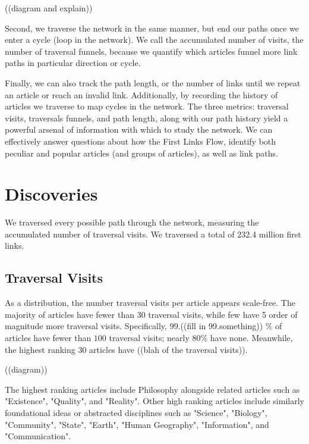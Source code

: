 \documentclass[twoside]{article}
\begin{document}
((diagram and explain))

Second, we traverse the network in the same manner, but end our paths once we enter a cycle (loop in the network).
We call the accumulated number of visits, the number of traversal funnels, because we quantify
which articles funnel more link paths in particular direction or cycle.

Finally, we can also track the path length, or the number of links until we repeat an article or reach an invalid link.
Additionally, by recording the history of articles we traverse to map cycles in the network.
The three metrics: traversal visits, traversals funnels, and path length, along with our path history
yield a powerful arsenal of information with which to study the network. 
We can effectively answer questions about how the First Links Flow, identify both peculiar and popular
articles (and groups of articles), as well as link paths.



\section{Discoveries}

We traversed every possible path through the network, measuring the accumulated number of traversal visits.
We traversed a total of 232.4 million first links.

\subsection{Traversal Visits}

As a distribution, the number traversal visits per article appears scale-free. The majority of articles have fewer than 30 traversal visits, while few 
have 5 order of magnitude more traversal visits. 
Specifically, $99.$((fill in 99.something)) $\%$ of articles have fewer than $100$ traversal visits; nearly $80\%$ have none. 
Meanwhile, the highest ranking 30 articles have ((blah of the traversal visits)).

((diagram))

The highest ranking articles include Philosophy alongside related articles such as "Existence", "Quality", and "Reality".
Other high ranking articles include similarly foundational ideas or abstracted disciplines such as "Science", "Biology", 
"Community", "State", "Earth", "Human Geography", "Information", and "Communication".
\end{document}
